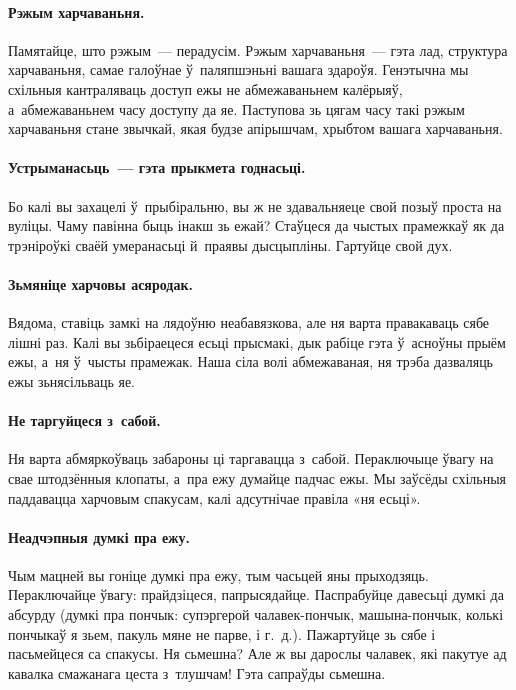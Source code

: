\paragraph{Рэжым харчаваньня.}

Памятайце, што рэжым~--- перадусім. Рэжым харчаваньня~--- гэта лад, структура харчаваньня, самае галоўнае ў~паляпшэньні вашага здароўя. Генэтычна мы схільныя кантраляваць доступ ежы не абмежаваньнем калёрыяў, а~абмежаваньнем часу доступу да яе. Паступова зь цягам часу такі рэжым харчаваньня стане звычкай, якая будзе апірышчам, хрыбтом вашага харчаваньня.

\paragraph{Устрыманасьць~--- гэта прыкмета годнасьці.}
Бо калі вы захацелі ў~прыбіральню, вы ж не здавальняеце свой позыў проста на вуліцы. Чаму павінна быць інакш зь ежай? Стаўцеся да чыстых прамежкаў як да трэніроўкі сваёй умеранасьці й~праявы дысцыпліны. Гартуйце свой дух.

\paragraph{Зьмяніце харчовы асяродак.} 
Вядома, ставіць замкі на лядоўню неабавязкова, але ня варта правакаваць сябе лішні раз. Калі вы зьбіраецеся есьці прысмакі, дык рабіце гэта ў~асноўны прыём ежы, а~ня ў~чысты прамежак. Наша сіла волі абмежаваная, ня трэба дазваляць ежы зьнясільваць яе.

\paragraph{Не таргуйцеся з~сабой.} 
Ня варта абмяркоўваць забароны ці таргавацца з~сабой. Пераключыце ўвагу на свае штодзённыя клопаты, а~пра ежу думайце падчас ежы. Мы заўсёды схільныя паддавацца харчовым спакусам, калі адсутнічае правіла «ня есьці».


\paragraph{Неадчэпныя думкі пра ежу.}
Чым мацней вы гоніце думкі пра ежу, тым часьцей яны прыходзяць. Пераключайце ўвагу: прайдзіцеся, папрысядайце. Паспрабуйце давесьці думкі да абсурду (думкі пра пончык: супэргерой чалавек-пончык, машына-пончык, колькі пончыкаў я зьем, пакуль мяне не парве, і г.~д.). Пажартуйце зь сябе і пасьмейцеся са спакусы. Ня сьмешна? Але ж вы дарослы чалавек, які пакутуе ад кавалка смажанага цеста з~тлушчам! Гэта сапраўды сьмешна.

